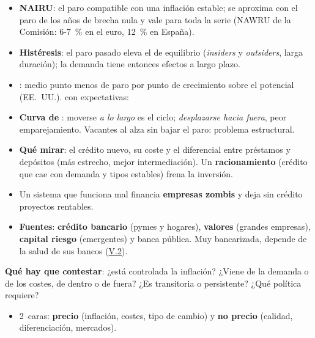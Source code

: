 \documentclass{article}
\begin{document}
\begin{columnas}
\begin{itemize}[itemsep=1.5pt]
\item \textbf{NAIRU}: el paro compatible con una inflación estable; se aproxima con el paro de los años de brecha nula y vale para toda la serie (NAWRU de la Comisión: 6-7~\% en el euro, 12~\% en España).
\item \textbf{Histéresis}: el paro pasado eleva el de equilibrio (\emph{insiders} y \emph{outsiders}, larga duración); la demanda tiene entonces efectos a largo plazo.
\end{itemize}
\begin{itemize}[itemsep=1.5pt]
\item \textbf{}: medio punto menos de paro por punto de crecimiento sobre el potencial (EE.~UU.). \textbf{} con expectativas:
\item \textbf{Curva de }: moverse \emph{a lo largo} es el ciclo; \emph{desplazarse hacia fuera}, peor emparejamiento. Vacantes al alza sin bajar el paro: problema estructural.
\end{itemize}

\begin{itemize}[itemsep=1.5pt]
\item \textbf{Qué mirar}: el crédito nuevo, su coste y el diferencial entre préstamos y depósitos (más estrecho, mejor intermediación). Un \textbf{racionamiento} (crédito que cae con demanda y tipos estables) frena la inversión.
\item Un sistema que funciona mal financia \textbf{empresas zombis} y deja sin crédito proyectos rentables.
\item \textbf{Fuentes}: \textbf{crédito bancario} (pymes y hogares), \textbf{valores} (grandes empresas), \textbf{capital riesgo} (emergentes) y banca pública. Muy bancarizada, depende de la salud de sus bancos (\hyperref[rep:V.2]{V.2}).
\end{itemize}

\begin{ideaclave}
\textbf{Qué hay que contestar}: ¿está controlada la inflación? ¿Viene de la demanda o de los costes, de dentro o de fuera? ¿Es transitoria o persistente? ¿Qué política requiere?
\end{ideaclave}
\begin{itemize}[itemsep=1.5pt]
\item 2~caras: \textbf{precio} (inflación, costes, tipo de cambio) y \textbf{no precio} (calidad, diferenciación, mercados).
\end{itemize}


\end{columnas}
\end{document}
